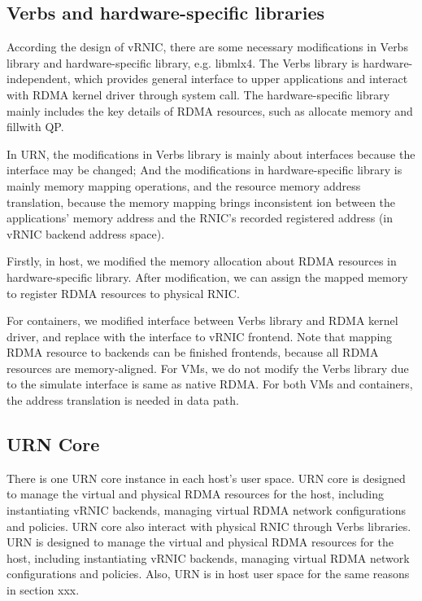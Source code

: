 \subsection{Verbs and hardware-specific libraries}
According the design of vRNIC, there are some necessary modifications in Verbs library and hardware-specific library, e.g. libmlx4. The Verbs library is hardware-independent, which provides general interface to upper applications and interact with RDMA kernel driver through system call. The hardware-specific library mainly includes the key details of RDMA resources, such as allocate memory and fillwith QP. 

In URN, the modifications in Verbs library is mainly about interfaces because the interface may be changed; And the modifications in hardware-specific library is mainly memory mapping operations, and the resource memory address translation, because the memory mapping brings inconsistent ion between the applications' memory address and the RNIC's recorded registered address (in vRNIC backend address space).

Firstly, in host, we modified the memory allocation about RDMA resources in hardware-specific library. After modification, we can assign the mapped memory to register RDMA resources to physical RNIC.

For containers, we modified interface between Verbs library and RDMA kernel driver, and replace with the interface to vRNIC frontend. Note that mapping RDMA resource to backends can be finished frontends, because all RDMA resources are memory-aligned. For VMs, we do not modify the Verbs library due to the simulate interface is same as native RDMA. For both VMs and containers, the address translation is needed in data path.



\subsection{URN Core}
There is one URN core instance in each host's user space. URN core is designed to manage the virtual and physical RDMA resources for the host, including instantiating vRNIC backends, managing virtual RDMA network configurations and policies. URN core also interact with physical RNIC through Verbs libraries. 
URN is designed to manage the virtual and physical RDMA resources for the host, including instantiating vRNIC backends, managing virtual RDMA network configurations and policies. Also, URN is in host user space for the same reasons in section xxx.

